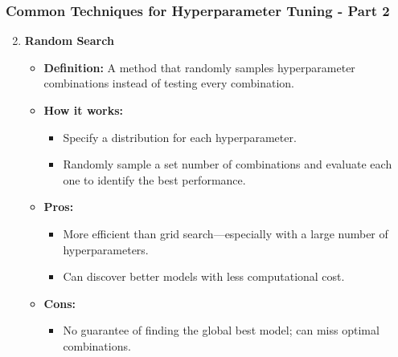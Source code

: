 \documentclass[aspectratio=169]{beamer}
\begin{document}
\begin{frame}[fragile]
    \frametitle{Common Techniques for Hyperparameter Tuning - Part 2}
    \begin{enumerate}
        \setcounter{enumi}{1}
        \item \textbf{Random Search}
        \begin{itemize}
            \item \textbf{Definition:} A method that randomly samples hyperparameter combinations instead of testing every combination.
            \item \textbf{How it works:}
            \begin{itemize}
                \item Specify a distribution for each hyperparameter.
                \item Randomly sample a set number of combinations and evaluate each one to identify the best performance.
            \end{itemize}
            \item \textbf{Pros:}
            \begin{itemize}
                \item More efficient than grid search—especially with a large number of hyperparameters.
                \item Can discover better models with less computational cost.
            \end{itemize}
            \item \textbf{Cons:}
            \begin{itemize}
                \item No guarantee of finding the global best model; can miss optimal combinations.
            \end{itemize}
        \end{itemize}
    \end{enumerate}
\end{frame}
\end{document}
